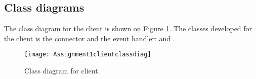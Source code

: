 \documentclass[Main]{subfiles}
\begin{document}
\subsection{Class diagrams}

The class diagram for the client is shown on Figure \ref{fig:clientuml}. 
The classes developed for the client is the connector and the event handler:   and .

\begin{figure}[hbtp]
\centering
\texttt{[image: Assignment1clientclassdiag]}
\caption{Class diagram for client.}
\label{fig:clientuml}
\end{figure}
\end{document}
